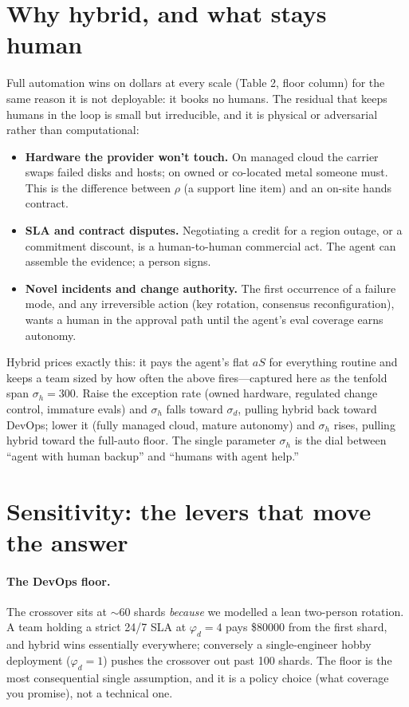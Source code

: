 \documentclass[11pt]{article}
\newcommand{\shards}{S}
\newcommand{\agentcost}{a}
\begin{document}
\section{Why hybrid, and what stays human}
\label{sec:hybrid}

Full automation wins on dollars at every scale (Table 2, floor column) for the same reason it is not
deployable: it books no humans. The residual that keeps humans in the loop is small but irreducible,
and it is physical or adversarial rather than computational:
\begin{itemize}[leftmargin=1.4em]
  \item \textbf{Hardware the provider won't touch.} On managed cloud the carrier swaps failed
  disks and hosts; on owned or co-located metal someone must. This is the difference between
  $\rho$ (a support line item) and an on-site hands contract.
  \item \textbf{SLA and contract disputes.} Negotiating a credit for a region outage, or a
  commitment discount, is a human-to-human commercial act. The agent can assemble the evidence; a
  person signs.
  \item \textbf{Novel incidents and change authority.} The first occurrence of a failure mode, and
  any irreversible action (key rotation, consensus reconfiguration), wants a human in the approval
  path until the agent's eval coverage earns autonomy.
\end{itemize}
Hybrid prices exactly this: it pays the agent's flat $\agentcost\shards$ for everything routine and
keeps a team sized by how often the above fires---captured here as the tenfold span
$\sigma_h=300$. Raise the exception rate (owned hardware, regulated change control, immature evals)
and $\sigma_h$ falls toward $\sigma_d$, pulling hybrid back toward DevOps; lower it (fully managed
cloud, mature autonomy) and $\sigma_h$ rises, pulling hybrid toward the full-auto floor. The single
parameter $\sigma_h$ is the dial between ``agent with human backup'' and ``humans with agent help.''

\section{Sensitivity: the levers that move the answer}
\label{sec:sens}

\paragraph{The DevOps floor.} The crossover sits at $\sim\!60$ shards \emph{because} we modelled a
lean two-person rotation. A team holding a strict 24/7 SLA at $\varphi_d=4$ pays \$\num{80000} from
the first shard, and hybrid wins essentially everywhere; conversely a single-engineer hobby
deployment ($\varphi_d=1$) pushes the crossover out past \num{100} shards. The floor is the most
consequential single assumption, and it is a policy choice (what coverage you promise), not a
technical one.
\end{document}
